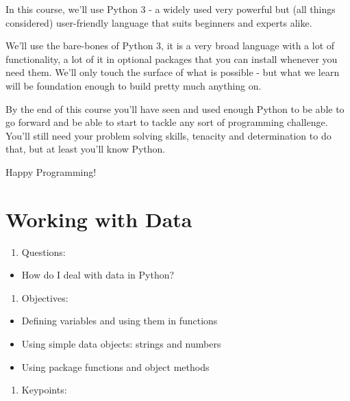 \documentclass[]{book}
\providecommand{\tightlist}{%
  \setlength{\itemsep}{0pt}\setlength{\parskip}{0pt}}
\theoremstyle{definition}
\theoremstyle{definition}
\theoremstyle{definition}
\theoremstyle{remark}
\begin{document}
In this course, we'll use Python 3 - a widely used very powerful but
(all things considered) user-friendly language that suits beginners and
experts alike.

We'll use the bare-bones of Python 3, it is a very broad language with a
lot of functionality, a lot of it in optional packages that you can
install whenever you need them. We'll only touch the surface of what is
possible - but what we learn will be foundation enough to build pretty
much anything on.

By the end of this course you'll have seen and used enough Python to be
able to go forward and be able to start to tackle any sort of
programming challenge. You'll still need your problem solving skills,
tenacity and determination to do that, but at least you'll know Python.

Happy Programming!

\hypertarget{data}{%
\chapter{Working with Data}\label{data}}

\begin{enumerate}
\def\labelenumi{\arabic{enumi}.}
\tightlist
\item
  Questions:
\end{enumerate}

\begin{itemize}
\tightlist
\item
  How do I deal with data in Python?
\end{itemize}

\begin{enumerate}
\def\labelenumi{\arabic{enumi}.}
\setcounter{enumi}{1}
\tightlist
\item
  Objectives:
\end{enumerate}

\begin{itemize}
\tightlist
\item
  Defining variables and using them in functions
\item
  Using simple data objects: strings and numbers
\item
  Using package functions and object methods
\end{itemize}

\begin{enumerate}
\def\labelenumi{\arabic{enumi}.}
\setcounter{enumi}{2}
\tightlist
\item
  Keypoints:
\end{enumerate}
\end{document}
